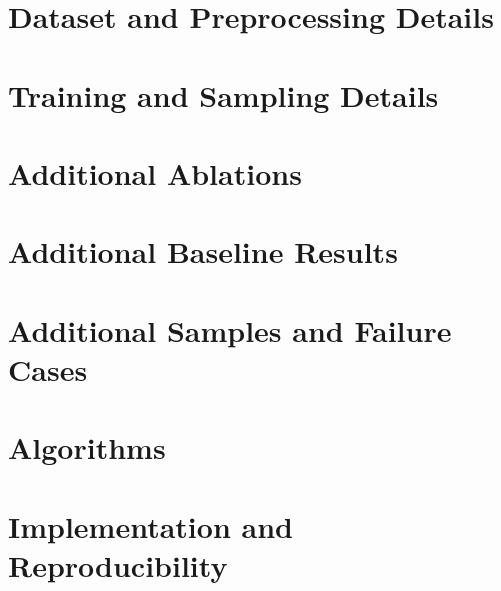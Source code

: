 \section{Dataset and Preprocessing Details}
\label{app:data}
\todo{}

\section{Training and Sampling Details}
\label{app:training}
\todo{}

\section{Additional Ablations}
\label{app:ablations}
\todo{}

\section{Additional Baseline Results}
\label{app:baselines}
\todo{}

\section{Additional Samples and Failure Cases}
\label{app:samples}
\todo{}

\section{Algorithms}
\label{app:algorithms}
\todo{}

\section{Implementation and Reproducibility}
\label{app:repro}
\todo{}
